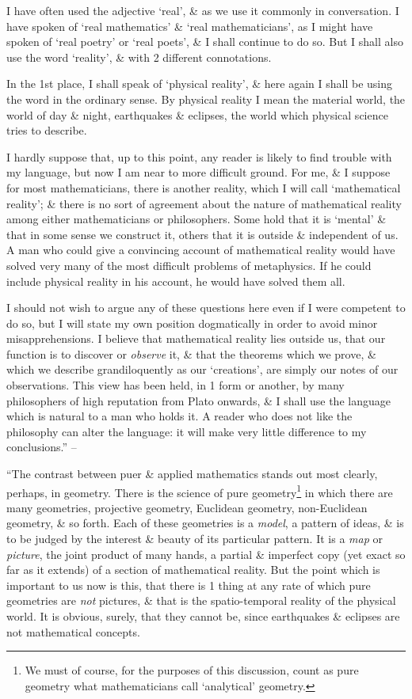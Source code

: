 \documentclass{article}
\numberwithin{equation}{section}
\begin{document}
I have often used the adjective `real', \& as we use it commonly in conversation. I have spoken of `real mathematics' \& `real mathematicians', as I might have spoken of `real poetry' or `real poets', \& I shall continue to do so. But I shall also use the word `reality', \& with 2 different connotations.

In the 1st place, I shall speak of `physical reality', \& here again I shall be using the word in the ordinary sense. By physical reality I mean the material world, the world of day \& night, earthquakes \& eclipses, the world which physical science tries to describe.

I hardly suppose that, up to this point, any reader is likely to find trouble with my language, but now I am near to more difficult ground. For me, \& I suppose for most mathematicians, there is another reality, which I will call `mathematical reality'; \& there is no sort of agreement about the nature of mathematical reality among either mathematicians or philosophers. Some hold that it is `mental' \& that in some sense we construct it, others that it is outside \& independent of us. A man who could give a convincing account of mathematical reality would have solved very many of the most difficult problems of metaphysics. If he could include physical reality in his account, he would have solved them all.

I should not wish to argue any of these questions here even if I were competent to do so, but I will state my own position dogmatically in order to avoid minor misapprehensions. I believe that mathematical reality lies outside us, that our function is to discover or \textit{observe} it, \& that the theorems which we prove, \& which we describe grandiloquently as our `creations', are simply our notes of our observations. This view has been held, in 1 form or another, by many philosophers of high reputation from Plato onwards, \& I shall use the language which is natural to a man who holds it. A reader who does not like the philosophy can alter the language: it will make very little difference to my conclusions.'' -- \cite[pp. 121--124]{Hardy1992}

 ``The contrast between puer \& applied mathematics stands out most clearly, perhaps, in geometry. There is the science of pure geometry\footnote{We must of course, for the purposes of this discussion, count as pure geometry what mathematicians call `analytical' geometry.} in which there are many geometries, projective geometry, Euclidean geometry, non-Euclidean geometry, \& so forth. Each of these geometries is a \textit{model}, a pattern of ideas, \& is to be judged by the interest \& beauty of its particular pattern. It is a \textit{map} or \textit{picture}, the joint product of many hands, a partial \& imperfect copy (yet exact so far as it extends) of a section of mathematical reality. But the point which is important to us now is this, that there is 1 thing at any rate of which pure geometries are \textit{not} pictures, \& that is the spatio-temporal reality of the physical world. It is obvious, surely, that they cannot be, since earthquakes \& eclipses are not mathematical concepts.
\end{document}
